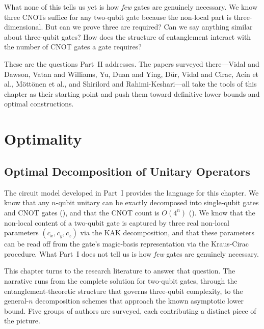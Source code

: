 \documentclass[12pt, a4paper, oneside]{report}
\theoremstyle{plain}
\theoremstyle{definition}
\theoremstyle{remark}
\begin{document}
What none of this tells us yet is how \emph{few} gates are genuinely necessary. We know
three CNOTs suffice for any two-qubit gate because the non-local part is three-dimensional.
But can we prove three are required? Can we say anything similar about three-qubit gates?
How does the structure of entanglement interact with the number of CNOT gates a gate requires?

These are the questions Part~II addresses. The papers surveyed there---Vidal and Dawson,
Vatan and Williams, Yu, Duan and Ying, Dür, Vidal and Cirac, Acín et al., Möttönen et al.,
and Shirilord and Rahimi-Keshari---all take the tools of this chapter as their starting
point and push them toward definitive lower bounds and optimal constructions.

\part{Optimality}

\chapter{Optimal Decomposition of Unitary Operators}
\label{ch:optimality}

The circuit model developed in Part~I provides the language for this chapter. We know that
any $n$-qubit unitary can be exactly decomposed into single-qubit gates and CNOT gates
(), and that the CNOT count is $O(4^n)$ ().
We know that the non-local content of a two-qubit gate is captured by three real
non-local parameters $(c_x, c_y, c_z)$ via the KAK decomposition, and that these parameters can be
read off from the gate's magic-basis representation via the Kraus-Cirac procedure. What Part~I does not tell us is how \emph{few} gates are genuinely
necessary.

This chapter turns to the research literature to answer that question. The narrative runs
from the complete solution for two-qubit gates, through the entanglement-theoretic structure
that governs three-qubit complexity, to the general-$n$ decomposition schemes that approach
the known asymptotic lower bound. Five groups of authors are surveyed, each contributing a
distinct piece of the picture.
\end{document}
